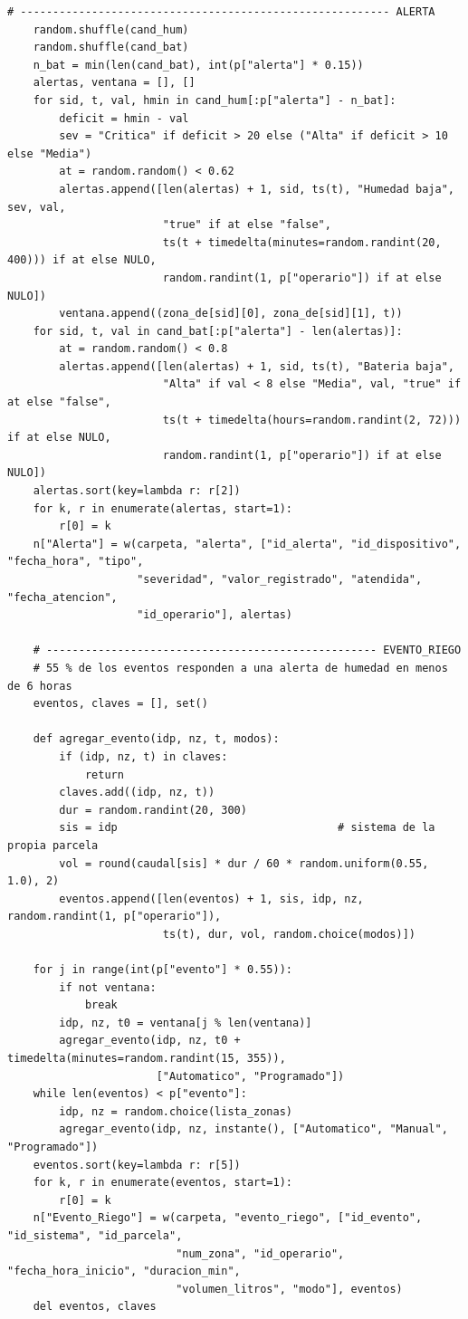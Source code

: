 \documentclass[11pt,letterpaper]{article}
\begin{document}
\begin{lstlisting}[style=py]
    # --------------------------------------------------------- ALERTA
    random.shuffle(cand_hum)
    random.shuffle(cand_bat)
    n_bat = min(len(cand_bat), int(p["alerta"] * 0.15))
    alertas, ventana = [], []
    for sid, t, val, hmin in cand_hum[:p["alerta"] - n_bat]:
        deficit = hmin - val
        sev = "Critica" if deficit > 20 else ("Alta" if deficit > 10 else "Media")
        at = random.random() < 0.62
        alertas.append([len(alertas) + 1, sid, ts(t), "Humedad baja", sev, val,
                        "true" if at else "false",
                        ts(t + timedelta(minutes=random.randint(20, 400))) if at else NULO,
                        random.randint(1, p["operario"]) if at else NULO])
        ventana.append((zona_de[sid][0], zona_de[sid][1], t))
    for sid, t, val in cand_bat[:p["alerta"] - len(alertas)]:
        at = random.random() < 0.8
        alertas.append([len(alertas) + 1, sid, ts(t), "Bateria baja",
                        "Alta" if val < 8 else "Media", val, "true" if at else "false",
                        ts(t + timedelta(hours=random.randint(2, 72))) if at else NULO,
                        random.randint(1, p["operario"]) if at else NULO])
    alertas.sort(key=lambda r: r[2])
    for k, r in enumerate(alertas, start=1):
        r[0] = k
    n["Alerta"] = w(carpeta, "alerta", ["id_alerta", "id_dispositivo", "fecha_hora", "tipo",
                    "severidad", "valor_registrado", "atendida", "fecha_atencion",
                    "id_operario"], alertas)

    # --------------------------------------------------- EVENTO_RIEGO
    # 55 % de los eventos responden a una alerta de humedad en menos de 6 horas
    eventos, claves = [], set()

    def agregar_evento(idp, nz, t, modos):
        if (idp, nz, t) in claves:
            return
        claves.add((idp, nz, t))
        dur = random.randint(20, 300)
        sis = idp                                  # sistema de la propia parcela
        vol = round(caudal[sis] * dur / 60 * random.uniform(0.55, 1.0), 2)
        eventos.append([len(eventos) + 1, sis, idp, nz, random.randint(1, p["operario"]),
                        ts(t), dur, vol, random.choice(modos)])

    for j in range(int(p["evento"] * 0.55)):
        if not ventana:
            break
        idp, nz, t0 = ventana[j % len(ventana)]
        agregar_evento(idp, nz, t0 + timedelta(minutes=random.randint(15, 355)),
                       ["Automatico", "Programado"])
    while len(eventos) < p["evento"]:
        idp, nz = random.choice(lista_zonas)
        agregar_evento(idp, nz, instante(), ["Automatico", "Manual", "Programado"])
    eventos.sort(key=lambda r: r[5])
    for k, r in enumerate(eventos, start=1):
        r[0] = k
    n["Evento_Riego"] = w(carpeta, "evento_riego", ["id_evento", "id_sistema", "id_parcela",
                          "num_zona", "id_operario", "fecha_hora_inicio", "duracion_min",
                          "volumen_litros", "modo"], eventos)
    del eventos, claves


\end{lstlisting}
\end{document}
